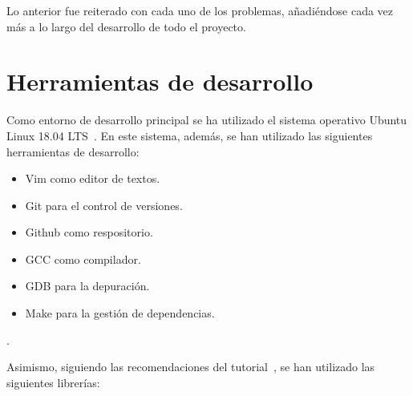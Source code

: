 Lo anterior fue reiterado con cada uno de los problemas, añadiéndose cada vez
más a lo largo del desarrollo de todo el proyecto.

\section{Herramientas de desarrollo}
\label{makereference5.2}

Como entorno de desarrollo principal se ha utilizado el sistema operativo Ubuntu
Linux 18.04 LTS~\cite{UBUNTU}. En este sistema, además, se han utilizado las
siguientes herramientas de desarrollo:

\begin{itemize}
		\item Vim como editor de textos.~\cite{VIM}
		\item Git para el control de versiones.~\cite{GIT}
		\item Github como respositorio.~\cite{GITHUB}
		\item GCC como compilador.~\cite{GCC}
		\item GDB para la depuración.~\cite{GDB}
		\item Make para la gestión de dependencias.~\cite{MAKE}
\end{itemize}. 

Asimismo, siguiendo las recomendaciones del tutorial~\citet{LearnOpenGL}, se han
utilizado las siguientes librerías:

